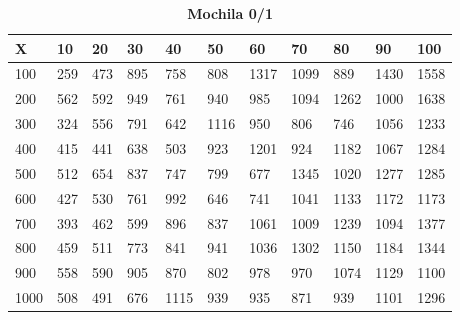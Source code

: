 \documentclass[10pt,letterpaper]{article}
\begin{document}
\newpage 
{}
\begin{center}
\begin{table}\renewcommand{\arraystretch}{2.5}
\caption{\large \textbf{Mochila 0/1}}
\centering
\begin{tabular} { |m{0.5cm}|m{1.3cm}|m{1.3cm}|m{1.3cm}|m{1.3cm}|m{1.3cm}|m{1.3cm}|m{1.3cm}|m{1.3cm}|m{1.3cm}|m{1.3cm}|} 
\hline
\rowcolor{Gray}
\centering \textbf{X} & \centering \textbf{10} & \centering \textbf{20} & \centering \textbf{30}\ & \centering \textbf{40} & \centering \textbf{50} & \centering \textbf{60}\ & \centering \textbf{70} & \centering \textbf{80} & \centering \textbf{90}\ & \textbf{100} \\\hline
\cellcolor{Gray}100 & \Large 259 & \Large 473 & \Large 895 & \Large 758 & \Large 808 & \Large 1317 & \Large 1099 & \Large 889 & \Large 1430 & \Large 1558 \\
\hline
\cellcolor{Gray}200 & \Large 562 & \Large 592 & \Large 949 & \Large 761 & \Large 940 & \Large 985 & \Large 1094 & \Large 1262 & \Large 1000 & \Large 1638 \\
\hline
\cellcolor{Gray}300 & \Large 324 & \Large 556 & \Large 791 & \Large 642 & \Large 1116 & \Large 950 & \Large 806 & \Large 746 & \Large 1056 & \Large 1233 \\
\hline
\cellcolor{Gray}400 & \Large 415 & \Large 441 & \Large 638 & \Large 503 & \Large 923 & \Large 1201 & \Large 924 & \Large 1182 & \Large 1067 & \Large 1284 \\
\hline
\cellcolor{Gray}500 & \Large 512 & \Large 654 & \Large 837 & \Large 747 & \Large 799 & \Large 677 & \Large 1345 & \Large 1020 & \Large 1277 & \Large 1285 \\
\hline
\cellcolor{Gray}600 & \Large 427 & \Large 530 & \Large 761 & \Large 992 & \Large 646 & \Large 741 & \Large 1041 & \Large 1133 & \Large 1172 & \Large 1173 \\
\hline
\cellcolor{Gray}700 & \Large 393 & \Large 462 & \Large 599 & \Large 896 & \Large 837 & \Large 1061 & \Large 1009 & \Large 1239 & \Large 1094 & \Large 1377 \\
\hline
\cellcolor{Gray}800 & \Large 459 & \Large 511 & \Large 773 & \Large 841 & \Large 941 & \Large 1036 & \Large 1302 & \Large 1150 & \Large 1184 & \Large 1344 \\
\hline
\cellcolor{Gray}900 & \Large 558 & \Large 590 & \Large 905 & \Large 870 & \Large 802 & \Large 978 & \Large 970 & \Large 1074 & \Large 1129 & \Large 1100 \\
\hline
\cellcolor{Gray}1000 & \Large 508 & \Large 491 & \Large 676 & \Large 1115 & \Large 939 & \Large 935 & \Large 871 & \Large 939 & \Large 1101 & \Large 1296 \\
\hline
\end{tabular} \\
\end{table}
\end{center}
\end{document}
